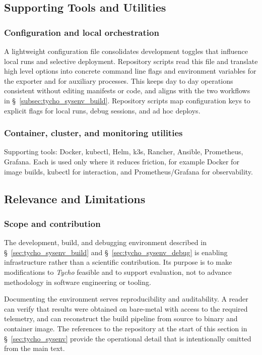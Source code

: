 \subsection{Supporting Tools and Utilities}
\label{sec:tycho_sysenv_util}

\subsubsection{Configuration and local orchestration}
\label{subsec:tycho_sysenv_util_config}
A lightweight configuration file  consolidates development toggles that influence local runs and selective deployment. Repository scripts read this file and translate high level options into concrete command line flags and environment variables for the exporter and for auxiliary processes. This keeps day to day operations consistent without editing manifests or code, and aligns with the two workflows in \S~\ref{subsec:tycho_sysenv_build}. Repository scripts map configuration keys to explicit flags for local runs, debug sessions, and ad hoc deploys.

\subsubsection{Container, cluster, and monitoring utilities}
\label{subsec:tycho_sysenv_util}
Supporting tools: Docker, kubectl, Helm, k3s, Rancher, Ansible, Prometheus, Grafana. Each is used only where it reduces friction, for example Docker for image builds, kubectl for interaction, and Prometheus/Grafana for observability.

\subsection{Relevance and Limitations}
\label{sec:tycho_sysenv_relevance}

\subsubsection{Scope and contribution}
\label{subsec:tycho_sysenv_relevance_scope}
The development, build, and debugging environment described in \S~\ref{sec:tycho_sysenv_build} and \S~\ref{sec:tycho_sysenv_debug} is enabling infrastructure rather than a scientific contribution. Its purpose is to make modifications to \textit{Tycho} feasible and to support evaluation, not to advance methodology in software engineering or tooling.

Documenting the environment serves reproducibility and auditability. A reader can verify that results were obtained on bare-metal with access to the required telemetry, and can reconstruct the build pipeline from source to binary and container image. The references to the repository at the start of this section in \S~\ref{sec:tycho_sysenv} provide the operational detail that is intentionally omitted from the main text.

